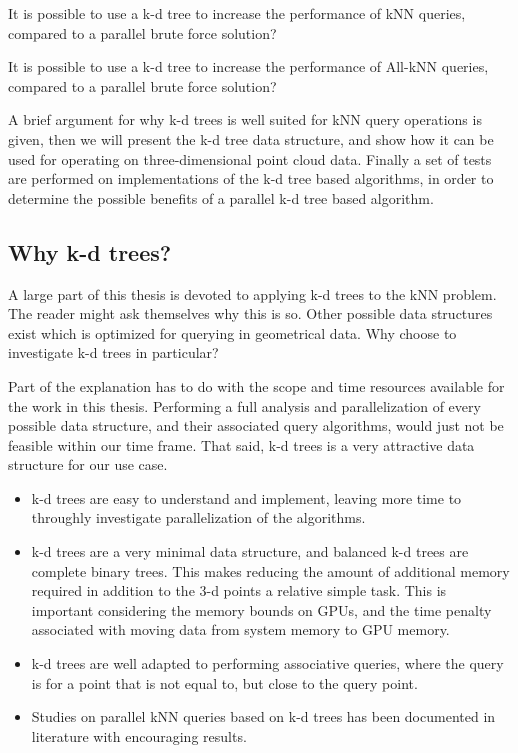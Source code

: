 \begin{myrq}
\label{rq:serial-kd-tree}
    It is possible to use a k-d tree to increase the performance of kNN queries, compared to a parallel brute force solution?
\end{myrq}

\begin{myrq}
\label{rq:serial-kd-tree-all-knn}
    It is possible to use a k-d tree to increase the performance of All-kNN queries, compared to a parallel brute force solution?
\end{myrq}

A brief argument for why k-d trees is well suited for kNN query operations is given, then we will present the k-d tree data structure, and show how it can be used for operating on three-dimensional point cloud data. Finally a set of tests are performed on implementations of the k-d tree based algorithms, in order to determine the possible benefits of a parallel k-d tree based algorithm.

\subsection{Why k-d trees?} %
\label{sub:why_k_d_trees_}
A large part of this thesis is devoted to applying k-d trees to the kNN problem. The reader might ask themselves why this is so. Other possible data structures exist which is optimized for querying in geometrical data. Why choose to investigate k-d trees in particular?

Part of the explanation has to do with the scope and time resources available for the work in this thesis. Performing a full analysis and parallelization of every possible data structure, and their associated query algorithms, would just not be feasible within our time frame. That said, k-d trees is a very attractive data structure for our use case.

\begin{itemize}
    \item k-d trees are easy to understand and implement, leaving more time to throughly investigate parallelization of the algorithms.
    \item k-d trees are a very minimal data structure, and balanced k-d trees are complete binary trees. This makes reducing the amount of additional memory required in addition to the 3-d points a relative simple task. This is important considering the memory bounds on GPUs, and the time penalty associated with moving data from system memory to GPU memory.
    \item k-d trees are well adapted to performing associative queries, where the query is for a point that is not equal to, but close to the query point.
    \item Studies on parallel kNN queries based on k-d trees has been documented in literature with encouraging results\cite{Owens:2007:ASO,Zhou:2008:RKC:1409060.1409079, Brown2010}.
\end{itemize}

